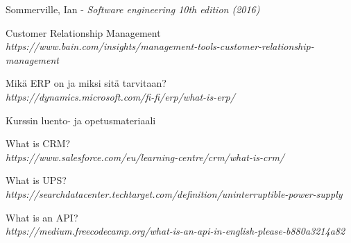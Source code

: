 \begin{thebibliography}{9}

 Sommerville, Ian - \textit{Software engineering 10th edition (2016)}

Customer Relationship Management
\\\textit{https://www.bain.com/insights/management-tools-customer-relationship-management}

Mikä ERP on ja miksi sitä tarvitaan?
\\\textit{https://dynamics.microsoft.com/fi-fi/erp/what-is-erp/}

Kurssin luento- ja opetusmateriaali

What is CRM?
\\\textit{https://www.salesforce.com/eu/learning-centre/crm/what-is-crm/}

What is UPS?
\\\textit{https://searchdatacenter.techtarget.com/definition/uninterruptible-power-supply}

What is an API?
\\\textit{https://medium.freecodecamp.org/what-is-an-api-in-english-please-b880a3214a82}

\end{thebibliography}
